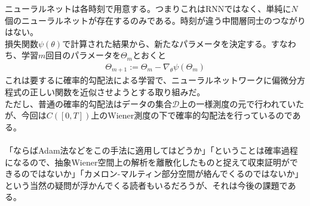 \documentclass{jsarticle}
\begin{document}
ニューラルネットは各時刻で用意する。つまりこれはRNNではなく、単純に$N$個のニューラルネットが存在するのみである。時刻が違う中間層同士のつながりはない。\\
損失関数$\psi(\theta)$で計算された結果から、新たなパラメータを決定する。すなわち、学習$m$回目のパラメータを$\Theta_m$とおくと
\begin{eqnarray}
\Theta_{m+1}:=\Theta_{m}-\nabla_\theta\psi(\Theta_m)
\end{eqnarray}
これは要するに確率的勾配法による学習で、ニューラルネットワークに偏微分方程式の正しい関数を近似させようとする取り組みだ。\\
ただし、普通の確率的勾配法はデータの集合$\mathcal{D}$上の一様測度の元で行われていたが、今回は$C([0,T])$上のWiener測度の下で確率的勾配法を行っているのである。\\
　\\
「ならばAdam法などをこの手法に適用してはどうか」「ということは確率過程になるので、抽象Wiener空間上の解析を離散化したものと捉えて収束証明ができるのではないか」「カメロン-マルティン部分空間が絡んでくるのではないか」という当然の疑問が浮かんでくる読者もいるだろうが、それは今後の課題である。

 
 
\newpage
\end{document}
